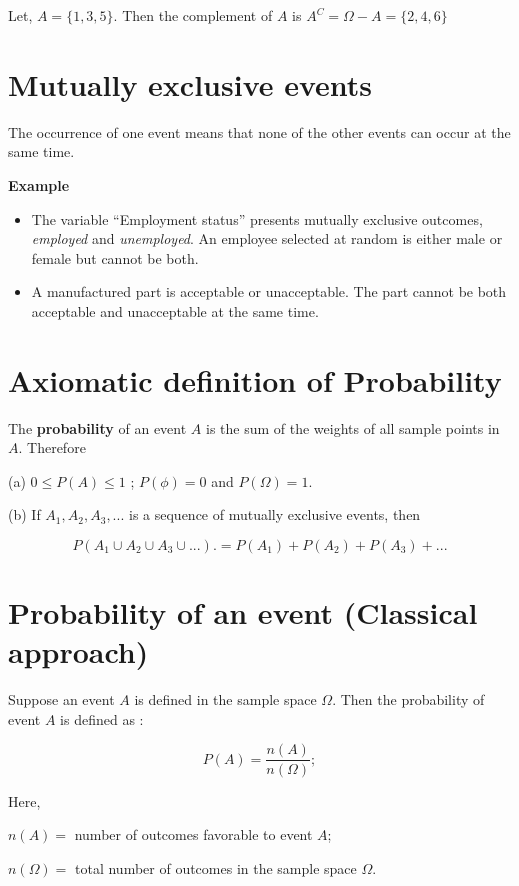 \documentclass[
  11pt,
  letterpaper,
  DIV=11,
  numbers=noendperiod]{scrreprt}
\begin{document}
Let, \(A=\{1,3,5 \}\). Then the complement of \(A\) is
\(A^C=\Omega-A=\{2,4,6\}\)

\section{Mutually exclusive events}\label{mutually-exclusive-events}

The occurrence of one event means that none of the other events can
occur at the same time.

\textbf{Example}

\begin{itemize}
\item
  The variable ``Employment status'' presents mutually exclusive
  outcomes, \emph{employed} and \emph{unemployed}. An employee selected
  at random is either male or female but cannot be both.
\item
  A manufactured part is acceptable or unacceptable. The part cannot be
  both acceptable and unacceptable at the same time.
\end{itemize}

\section{Axiomatic definition of
Probability}\label{axiomatic-definition-of-probability}

The \textbf{probability} of an event \(A\) is the sum of the weights of
all sample points in \(A\). Therefore

(a) \(0 \le P(A)\le 1\) ; \(P(\phi)=0\) and \(P(\Omega)=1\).

(b) If \(A_1, A_2,A_3,...\) is a sequence of mutually exclusive events,
then

\[P(A_1\cup A_2 \cup  A_3\cup ...).=P(A_1)+P(A_2)+P(A_3)+...\]

\section{Probability of an event (Classical
approach)}\label{probability-of-an-event-classical-approach}

Suppose an event \(A\) is defined in the sample space \(\Omega\). Then
the probability of event \(A\) is defined as :

\[P(A)=\frac{n(A)}{n(\Omega)};\]

Here,

\(n(A)=\) number of outcomes favorable to event \(A\);

\(n(\Omega)=\) total number of outcomes in the sample space \(\Omega\).
\end{document}
